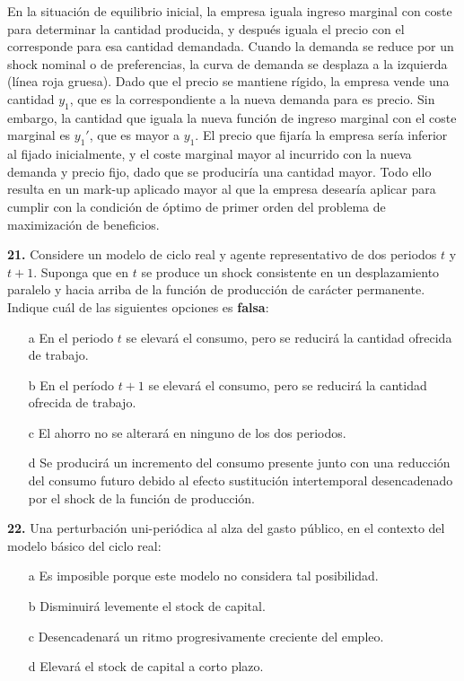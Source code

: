 \documentclass{nuevotema}
\begin{document}
En la situación de equilibrio inicial, la empresa iguala ingreso marginal con coste para determinar la cantidad producida, y después iguala el precio con el corresponde para esa cantidad demandada. Cuando la demanda se reduce por un shock nominal o de preferencias, la curva de demanda se desplaza a la izquierda (línea roja gruesa). Dado que el precio se mantiene rígido, la empresa vende una cantidad $y_1$, que es la correspondiente a la nueva demanda para es precio. Sin embargo, la cantidad que iguala la nueva función de ingreso marginal con el coste marginal es $y_1'$, que es mayor a $y_1$. El precio que fijaría la empresa sería inferior al fijado inicialmente, y el coste marginal mayor al incurrido con la nueva demanda y precio fijo, dado que se produciría una cantidad mayor. Todo ello resulta en un mark-up aplicado mayor al que la empresa desearía aplicar para cumplir con la condición de óptimo de primer orden del problema de maximización de beneficios.






\preguntas


\textbf{21.} Considere un modelo de ciclo real y agente representativo de dos periodos $t$ y $t+1$. Suponga que en $t$ se produce un shock consistente en un desplazamiento paralelo y hacia arriba de la función de producción de carácter permanente. Indique cuál de las siguientes opciones es \textbf{falsa}:

\begin{itemize}
	\item[a] En el periodo $t$ se elevará el consumo, pero se reducirá la cantidad ofrecida de trabajo.
	\item[b] En el período $t+1$ se elevará el consumo, pero se reducirá la cantidad ofrecida de trabajo.
	\item[c] El ahorro no se alterará en ninguno de los dos periodos.
	\item[d] Se producirá un incremento del consumo presente junto con una reducción del consumo futuro debido al efecto sustitución intertemporal desencadenado por el shock de la función de producción.
\end{itemize}


\textbf{22.} Una perturbación uni-periódica al alza del gasto público, en el contexto del modelo básico del ciclo real:
\begin{itemize}
	\item[a] Es imposible porque este modelo no considera tal posibilidad.
	\item[b] Disminuirá levemente el stock de capital.
	\item[c] Desencadenará un ritmo progresivamente creciente del empleo.
	\item[d] Elevará el stock de capital a corto plazo.
\end{itemize}
\end{document}
